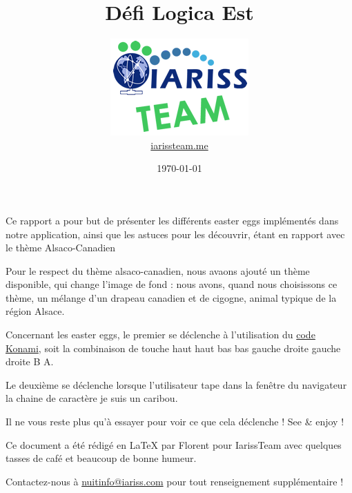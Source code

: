 \documentclass[12pt, a4paper]{article}
\title{Défi Logica Est}
\newcommand{\espace}{\vspace{.8cm}}
\newcommand{\authors}{Florent}
\begin{document}
\author{\includegraphics{../_img/iariss_team.png} \\ {\sffamily \href{http://iarissteam.me}{iarissteam.me}}}
\date{\today}

\maketitle{}

{\sffamily Ce rapport a pour but de présenter les différents easter eggs implémentés dans notre application, ainsi que les astuces pour les découvrir, étant en rapport avec le thème Alsaco-Canadien}

\espace{}
Pour le respect du thème alsaco-canadien, nous avaons ajouté un thème disponible, qui change l'image de fond : nous avons, quand nous choisissons ce thème, un mélange d'un drapeau canadien et de cigogne, animal typique de la région Alsace.

Concernant les easter eggs, le premier se déclenche à l'utilisation du \href{http://fr.wikipedia.org/wiki/Code_Konami}{code Konami}, soit la combinaison de touche haut haut bas bas gauche droite gauche droite B A.

Le deuxième se déclenche lorsque l'utilisateur tape dans la fenêtre du navigateur la chaine de caractère \og{}je suis un caribou\fg{}.

Il ne vous reste plus qu'à essayer pour voir ce que cela déclenche ! See & enjoy !


\espace\vfill{}
Ce document a été rédigé en \LaTeX{} par \authors{} pour IarissTeam avec quelques tasses de café et beaucoup de bonne humeur.

Contactez-nous à \href{mailto:nuitinfo@iariss.com}{nuitinfo@iariss.com} pour tout renseignement supplémentaire !
\end{document}
